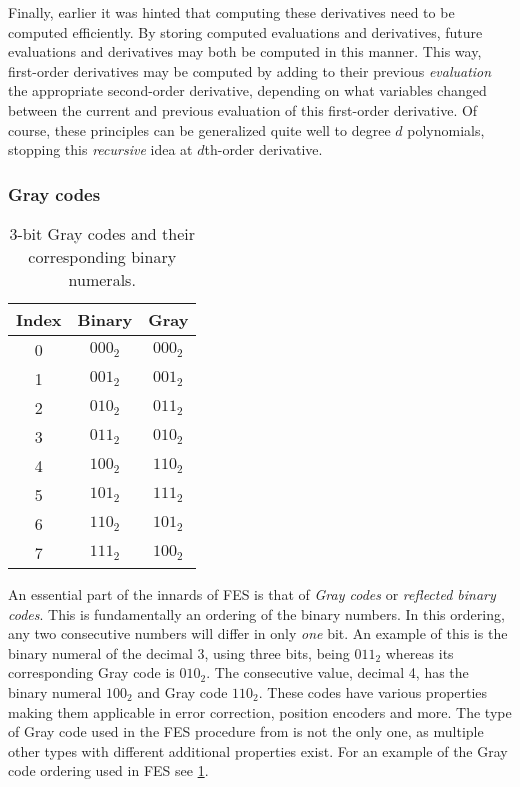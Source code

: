 Finally, earlier it was hinted that computing these derivatives need to be computed efficiently. By storing computed evaluations and derivatives, future evaluations and derivatives may both be computed in this manner. This way, first-order derivatives may be computed by adding to their previous \textit{evaluation} the appropriate second-order derivative, depending on what variables changed between the current and previous evaluation of this first-order derivative. Of course, these principles can be generalized quite well to degree $d$ polynomials, stopping this \textit{recursive} idea at $d$th-order derivative.

\subsubsection{Gray codes} \label{sec:prereq:fes:gray_codes}

\begin{table}[t]
    \begin{center}
        \begin{tabular}{||c|c|c||}
            \hline
            Index & Binary & Gray \\
            \hline
            0 & $000_2$ & $000_2$\\
            1 & $001_2$ & $001_2$\\
            2 & $010_2$ & $011_2$\\
            3 & $011_2$ & $010_2$\\
            4 & $100_2$ & $110_2$\\
            5 & $101_2$ & $111_2$\\
            6 & $110_2$ & $101_2$\\
            7 & $111_2$ & $100_2$\\
            \hline
        \end{tabular}
    \end{center}
    \caption{3-bit Gray codes and their corresponding binary numerals.} \label{tbl:gray}
\end{table}

An essential part of the innards of FES is that of \textit{Gray codes} or \textit{reflected binary codes}. This is fundamentally an ordering of the binary numbers. In this ordering, any two consecutive numbers will differ in only \textit{one} bit. An example of this is the binary numeral of the decimal 3, using three bits, being $011_2$ whereas its corresponding Gray code is $010_2$.
The consecutive value, decimal 4, has the binary numeral $100_2$ and Gray code $110_2$. These codes have various properties making them applicable in error correction, position encoders and more. The type of Gray code used in the FES procedure from \cite{ches-2010-23990, cryptoeprint:2013/436} is not the only one, as multiple other types with different additional properties exist. For an example of the Gray code ordering used in FES see \cref{tbl:gray}.

